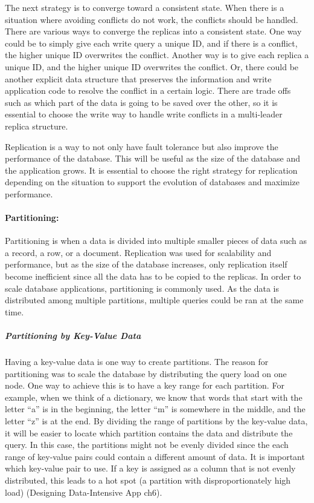 The next strategy is to converge toward a consistent state. When there is a situation where avoiding conflicts do not work, the conflicts should be handled. There are various ways to converge the replicas into a consistent state. One way could be to simply give each write query a unique ID, and if there is a conflict, the higher unique ID overwrites the conflict. Another way is to give each replica a unique ID, and the higher unique ID overwrites the conflict. Or, there could be another explicit data structure that preserves the information and write application code to resolve the conflict in a certain logic. There are trade offs such as which part of the data is going to be saved over the other, so it is essential to choose the write way to handle write conflicts in a multi-leader replica structure.

Replication is a way to not only have fault tolerance but also improve the performance of the database. This will be useful as the size of the database and the application grows. It is essential to choose the right strategy for replication depending on the situation to support the evolution of databases and maximize performance.

\paragraph{Partitioning:}
Partitioning is when a data is divided into multiple smaller pieces of data such as a record, a row, or a document. Replication was used for scalability and performance, but as the size of the database increases, only replication itself become inefficient since all the data has to be copied to the replicas. In order to scale database applications, partitioning is commonly used. As the data is distributed among multiple partitions, multiple queries could be ran at the same time. 

\subparagraph{Partitioning by Key-Value Data}
Having a key-value data is one way to create partitions. The reason for partitioning was to scale the database by distributing the query load on one node. One way to achieve this is to have a key range for each partition. For example, when we think of a dictionary, we know that words that start with the letter “a” is in the beginning, the letter “m” is somewhere in the middle, and the letter “z” is at the end. By dividing the range of partitions by the key-value data, it will be easier to locate which partition contains the data and distribute the query. In this case, the partitions might not be evenly divided since the each range of key-value pairs could contain a different amount of data. It is important which key-value pair to use. If a key is assigned as a column that is not evenly distributed, this leads to a hot spot (a partition with disproportionately high load) (Designing Data-Intensive App  ch6). 


